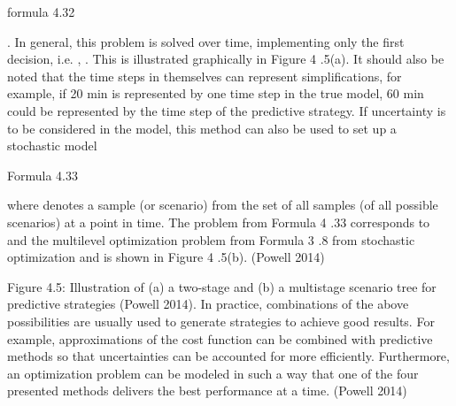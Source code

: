 formula 4.32

. In general, this problem is solved over time, implementing only the first decision, i.e. , . This is illustrated graphically in Figure 4 .5(a).
It should also be noted that the time steps in themselves can represent simplifications, for example, if 20 min is represented by one time step in the true model, 60 min could be represented by the time step of the predictive strategy. If uncertainty is to be considered in the model, this method can also be used to set up a stochastic model



Formula 4.33

where denotes a sample (or scenario) from the set of all samples (of all possible scenarios) at a point in time. The problem from Formula 4 .33 corresponds to and the multilevel optimization problem from Formula 3 .8 from stochastic optimization and is shown in Figure 4 .5(b). (Powell 2014)

Figure 4.5: Illustration of (a) a two-stage and (b) a multistage scenario tree for predictive strategies (Powell 2014).
In practice, combinations of the above possibilities are usually used to generate strategies to achieve good results. For example, approximations of the cost function can be combined with predictive methods so that uncertainties can be accounted for more efficiently. Furthermore, an optimization problem can be modeled in such a way that one of the four presented methods delivers the best performance at a time. (Powell 2014)


